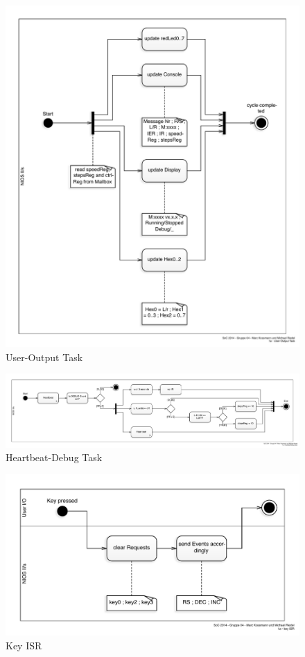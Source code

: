 \documentclass[ngerman,fontsize=12pt , paper=a4 , twoside=false , DIV12 , BCOR=1cm ,
numbers=enddot , listof=totoc , bibliography=totoc , index=totoc ,
headings=small , headlines=1.5 , final]{scrbook}
\begin{document}
\begin{figure}[htbp]
\centering
\includegraphics{../Diagrams/Activities/Tasks/User-Output.pdf}
\caption{User-Output Task\label{fig:user_output}}
\end{figure}

\begin{figure}[htbp]
\centering
\includegraphics{../Diagrams/Activities/Tasks/Heartbeat-Debug.pdf}
\caption{Heartbeat-Debug Task\label{fig:heartbeat_debug}}
\end{figure}

\newpage

\begin{figure}[htbp]
\centering
\includegraphics{../Diagrams/Activities/ISR/key_ISR.pdf}
\caption{Key ISR\label{fig:key_isr}}
\end{figure}
\end{document}

